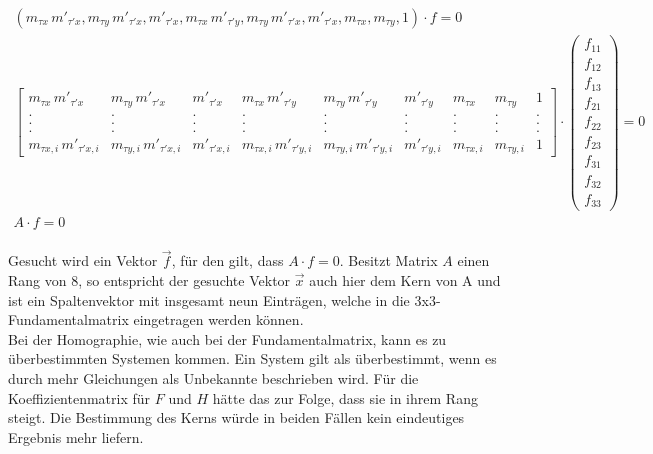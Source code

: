 \begin{gather*}
	(m_{\tau x}\,m'_{\tau'x},m_{\tau y}\,m'_{\tau'x},m'_{\tau'x},m_{\tau x}\,m'_{\tau'y},m_{\tau y}\,m'_{\tau'x},m'_{\tau'x},m_{\tau x},m_{\tau y},1)\cdot f =0\\
	\begin{bmatrix}
		m_{\tau x}\,m'_{\tau'x}&m_{\tau y}\,m'_{\tau'x}&m'_{\tau'x}&m_{\tau x}\,m'_{\tau'y}&m_{\tau y}\,m'_{\tau'y}&m'_{\tau'y}&m_{\tau x}&m_{\tau y}&1\\
		.&.&.&.&.&.&.&.&.\\
		.&.&.&.&.&.&.&.&.\\
		.&.&.&.&.&.&.&.&.\\
		m_{\tau x,i}\,m'_{\tau'x,i}&m_{\tau y,i}\,m'_{\tau'x,i}&m'_{\tau'x,i}&m_{\tau x,i}\,m'_{\tau'y,i}&m_{\tau y,i}\,m'_{\tau'y,i}&m'_{\tau'y,i}&m_{\tau x,i}&m_{\tau y,i}&1
	\end{bmatrix}
	\cdot 
	\begin{pmatrix}
		f_{11}\\f_{12}\\f_{13}\\f_{21}\\f_{22}\\f_{23}\\f_{31}\\f_{32}\\f_{33}
	\end{pmatrix}
	= 0\\
	A\cdot f = 0
\end{gather*}\\


Gesucht wird ein Vektor $\vec{f}$, für den gilt, dass $A \cdot f = 0$. Besitzt Matrix $A$ einen Rang von 8, so entspricht der gesuchte Vektor $\vec{x}$ auch hier dem Kern von A und ist ein Spaltenvektor mit insgesamt neun Einträgen, welche in die 3x3-Fundamentalmatrix eingetragen werden können\cite{HZ,ZZGXr}.\\


Bei der Homographie, wie auch bei der Fundamentalmatrix, kann es zu überbestimmten Systemen kommen. Ein System gilt als überbestimmt, wenn es durch mehr Gleichungen als Unbekannte beschrieben wird\cite{Schwarz,Scholz}. Für die Koeffizientenmatrix für $F$ und $H$ hätte das zur Folge, dass sie in ihrem Rang steigt. Die Bestimmung des Kerns würde in beiden Fällen kein eindeutiges Ergebnis mehr liefern\cite{HZ,Schwarz}.\\


